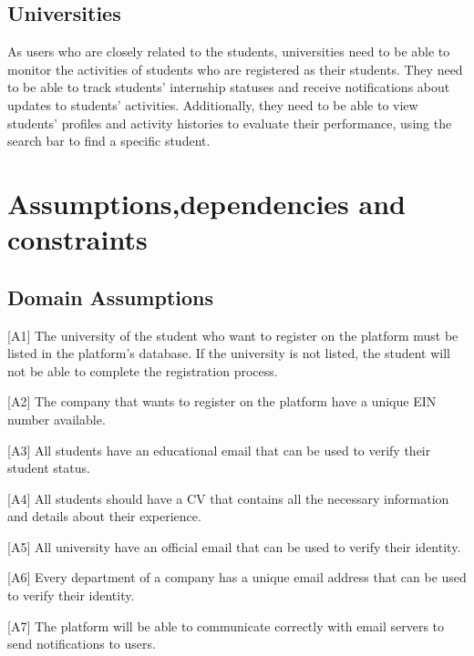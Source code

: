 \subsection{Universities}
As users who are closely related to the students, universities need to be able to monitor the activities of students who are registered as their students.
They need to be able to track students' internship statuses and receive notifications about updates to students' activities. Additionally, they need to 
be able to view students' profiles and activity histories to evaluate their performance, using the search bar to find a specific student.

\section{Assumptions,dependencies and constraints}\label{subsec:assumptions_dependencies_constraints}
\subsection{Domain Assumptions}
[A1] The university of the student who want to register on the platform must be listed in the platform's database. If the university is not listed, the student
will not be able to complete the registration process.

[A2] The company that wants to register on the platform have a unique EIN number available.

[A3] All students have an educational email that can be used to verify their student status.

[A4] All students should have a CV that contains all the necessary information and details about their experience.

[A5] All university have an official email that can be used to verify their identity.

[A6] Every department of a company has a unique email address that can be used to verify their identity.

[A7] The platform will be able to communicate correctly with email servers to send notifications to users.
